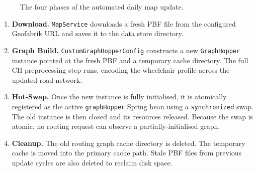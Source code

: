 \documentclass[12pt, a4paper]{report}
\begin{document}
\begin{figure}[H]
\centering
{}
\caption{The four phases of the automated daily map update.}
\label{fig:mapupdate}
\end{figure}

\begin{enumerate}[leftmargin=*, label=\textbf{Phase \arabic{enumi}:}]
  \item \textbf{Download.} \texttt{MapService} downloads a fresh PBF file from the configured Geofabrik URL and saves it to the data store directory.
  \item \textbf{Graph Build.} \texttt{CustomGraphHopperConfig} constructs a new \texttt{GraphHopper} instance pointed at the fresh PBF and a temporary cache directory. The full CH preprocessing step runs, encoding the wheelchair profile across the updated road network.
  \item \textbf{Hot-Swap.} Once the new instance is fully initialised, it is atomically registered as the active \texttt{graphHopper} Spring bean using a \texttt{synchronized} swap. The old instance is then closed and its resources released. Because the swap is atomic, no routing request can observe a partially-initialised graph.
  \item \textbf{Cleanup.} The old routing graph cache directory is deleted. The temporary cache is moved into the primary cache path. Stale PBF files from previous update cycles are also deleted to reclaim disk space.
\end{enumerate}
\end{document}
